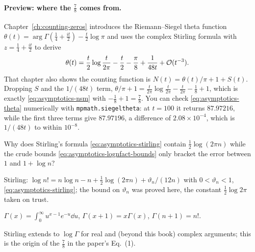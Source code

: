 \paragraph{Preview: where the $\tfrac78$ comes from.} Chapter~\ref{ch:counting-zeros} introduces the Riemann--Siegel theta function $\theta(t)=\arg\Gamma(\tfrac14+\tfrac{it}{2})-\tfrac t2\log\pi$ and uses the complex Stirling formula with $z=\tfrac14+\tfrac{it}2$ to derive
\begin{equation}
\theta(t)=\frac t2\log\frac{t}{2\pi}-\frac t2-\frac\pi8+\frac{1}{48t}+\mathcal{O}(t^{-3}).
\label{eq:asymptotics-theta}
\end{equation}
That chapter also shows the counting function is $N(t)=\theta(t)/\pi+1+S(t)$. Dropping $S$ and the $1/(48t)$ term, $\theta/\pi+1=\frac{t}{2\pi}\log\frac{t}{2\pi}-\frac{t}{2\pi}-\frac18+1$, which is exactly \cref{eq:asymptotics-nsm} with $-\tfrac18+1=\tfrac78$. You can check \cref{eq:asymptotics-theta} numerically with \texttt{mpmath.siegeltheta}: at $t=100$ it returns $87.97216$, while the first three terms give $87.97196$, a difference of $2.08\times10^{-4}$, which is $1/(48t)$ to within $10^{-8}$.

\begin{checkpoint}
Why does Stirling's formula \cref{eq:asymptotics-stirling} contain $\tfrac12\log(2\pi n)$ while the crude bounds \cref{eq:asymptotics-lognfact-bounds} only bracket the error between $1$ and $1+\log n$?
\end{checkpoint}

\begin{keyideas}
\item Stirling: $\log n!=n\log n-n+\tfrac12\log(2\pi n)+\vartheta_n/(12n)$ with $0<\vartheta_n<1$, \cref{eq:asymptotics-stirling}; the bound on $\vartheta_n$ was proved here, the constant $\tfrac12\log2\pi$ taken on trust.
\item $\Gamma(x)=\int_0^\infty u^{x-1}e^{-u}\dd u$, $\Gamma(x+1)=x\Gamma(x)$, $\Gamma(n+1)=n!$.
\item Stirling extends to $\log\Gamma$ for real and (beyond this book) complex arguments; this is the origin of the $\tfrac78$ in the paper's Eq.~(1).
\end{keyideas}

